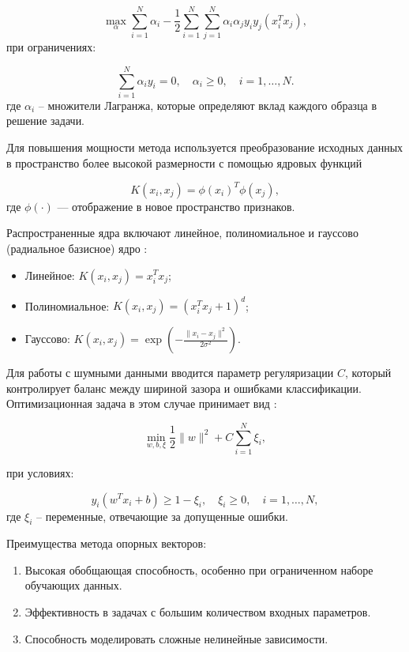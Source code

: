 \begin{equation}
	\max_{\alpha} \sum_{i=1}^N \alpha_i - \frac{1}{2} \sum_{i=1}^N \sum_{j=1}^N \alpha_i \alpha_j y_i y_j (x_i^T x_j),
\end{equation}
при ограничениях:

\begin{equation}
	\sum_{i=1}^N \alpha_i y_i = 0, \quad \alpha_i \geq 0, \quad i = 1, \ldots, N.
\end{equation}
где $\alpha_i$ -- множители Лагранжа, которые определяют вклад каждого образца в решение задачи.

Для повышения мощности метода используется преобразование исходных данных
в пространство более высокой размерности с помощью ядровых
функций

\begin{equation}
	K(x_i, x_j) = \phi(x_i)^T \phi(x_j),
\end{equation}
где $\phi(\cdot)$ — отображение в новое
пространство признаков.

Распространенные ядра включают линейное,
полиномиальное и гауссово (радиальное базисное) ядро \cite{Deris2011}:

\begin{itemize}
	\item Линейное: $K(x_i, x_j) = x_i^T x_j$;
	\item Полиномиальное: $K(x_i, x_j) = (x_i^T x_j + 1)^d$;
	\item Гауссово: $K(x_i, x_j) = \exp\left(-\frac{\|x_i - x_j\|^2}{2\sigma^2}\right)$.
\end{itemize}

Для работы с шумными данными вводится параметр регуляризации $C$,
который контролирует баланс между шириной зазора и ошибками классификации.
Оптимизационная задача в этом случае принимает вид \cite{Boswell2002}:

\begin{equation}
	\min_{w, b, \xi} \frac{1}{2} \|w\|^2 + C \sum_{i=1}^N \xi_i,
\end{equation}

при условиях:

\begin{equation}
	y_i (w^T x_i + b) \geq 1 - \xi_i, \quad \xi_i \geq 0, \quad i = 1, \ldots, N,
\end{equation}
где $\xi_i$ -- переменные, отвечающие за допущенные ошибки.

Преимущества метода опорных векторов:

\begin{enumerate}
	\item Высокая обобщающая способность, особенно при ограниченном наборе обучающих данных.
	\item Эффективность в задачах с большим количеством входных параметров.
	\item Способность моделировать сложные нелинейные зависимости.
\end{enumerate}

